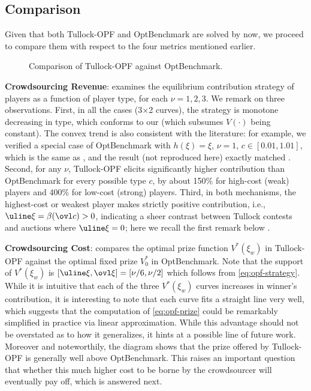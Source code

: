 \documentclass{sig-alternate-10pt}
\begin{document}
\subsection{Comparison}
Given that both Tullock-OPF and OptBenchmark are solved by now, we proceed to compare them with respect to the four metrics mentioned earlier.

\setcounter{figure}{2}
\begin{figure*}[tb]
\centering
{}\hfil
{}\hfil
{}
\caption{Comparison of Tullock-OPF against OptBenchmark.}
\label{fig:compare}
\end{figure*}

{\bf Crowdsourcing Revenue}:  examines the equilibrium contribution strategy of players as a function of player type, for each $\nu=1,2,3$. We remark on three observations. First, in all the cases (3$\times$2 curves), the strategy is monotone decreasing in type, which conforms to our  (which subsumes $V(\cdot)$ being constant). The convex trend is also consistent with the literature: for example, we verified a special case of OptBenchmark with $h(\xi)=\xi$, $\nu=1$, $c\in[0.01,1.01]$, which is the same as \cite{Fey08}, and the result (not reproduced here) exactly matched \cite{Fey08}. Second, for any $\nu$, Tullock-OPF elicits significantly higher contribution than OptBenchmark for every possible type $c$, by about 150\% for high-cost (weak) players and 400\% for low-cost (strong) players. Third, in both mechanisms, the highest-cost or weakest player makes strictly positive contribution, i.e., $\uline\xi=\beta(\ovl c)>0$, indicating a sheer contrast between Tullock contests and auctions where $\uline\xi=0$; here we recall the first remark below .

{\bf Crowdsourcing Cost}:  compares the optimal prize function $V^*(\xi_w)$ in Tullock-OPF against the optimal fixed prize $V_0^*$ in OptBenchmark. Note that the support of $V^*(\xi_w)$ is $[\uline\xi,\ovl\xi]=[\nu/6,\nu/2]$ which follows from \eqref{eq:opf-strategy}. While it is intuitive that each of the three $V^*(\xi_w)$ curves increases in winner's contribution, it is interesting to note that each curve fits a straight line very well, which suggests that the computation of \eqref{eq:opf-prize} could be remarkably simplified in practice via linear approximation. While this advantage should not be overstated as to how it generalizes, it hints at a possible line of future work. Moreover and noteworthily, the diagram shows that the prize offered by Tullock-OPF is generally well above OptBenchmark. This raises an important question that whether this much higher cost to be borne by the crowdsourcer will eventually pay off, which is answered next.
\end{document}
